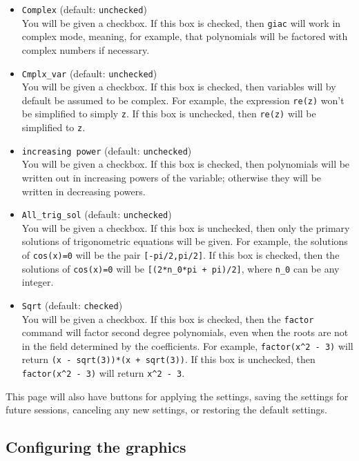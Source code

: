\documentclass[a4paper,11pt]{book}
\begin{document}
\begin{itemize}
  \item \texttt{Complex}  (default: \texttt{unchecked})\\
  You will be given a checkbox.  If this box is checked, then
  \texttt{giac} will work in complex mode, meaning, for example, that
  polynomials will be factored with complex numbers if necessary.
  
  \item \texttt{Cmplx\_var}  (default: \texttt{unchecked})\\
  You will be given a checkbox.  If this box is checked, then
  variables will by default be assumed to be complex.  For example,
  the expression \texttt{re(z)} won't be simplified to simply
  \texttt{z}.  If this box is unchecked, then \texttt{re(z)} will be
  simplified to \texttt{z}.
  
  \item \texttt{increasing power}  (default: \texttt{unchecked})\\
  You will be given a checkbox.  If this box is checked, then
  polynomials will be written out in increasing powers of the
  variable; otherwise they will be written in decreasing powers.
  
  \item \texttt{All\_trig\_sol}  (default: \texttt{unchecked})\\
  You will be given a checkbox.  If this box is unchecked, then only
  the primary solutions of trigonometric equations will be given.  For
  example, the solutions of \texttt{cos(x)=0} will be the pair
  \texttt{[-pi/2,pi/2]}.  If this box is checked, then the solutions of 
  \texttt{cos(x)=0} will be \texttt{[(2*n\_0*pi + pi)/2]}, where
  \texttt{n\_0} can be any integer.
  
  \item \texttt{Sqrt}  (default: \texttt{checked})\\
  You will be given a checkbox.  If this box is checked, then the
  \texttt{factor} command will factor second degree polynomials, even
  when the roots are not in the field determined by the coefficients.
  For example, \texttt{factor(x\^{}2 - 3)} will return 
  \texttt{(x - sqrt(3))*(x + sqrt(3))}.  If this box is unchecked, then 
  \texttt{factor(x\^{}2 - 3)} will return \texttt{x\^{}2 - 3}.
\end{itemize}
This page will also have buttons for applying the settings, saving the
settings for future sessions, canceling any new settings, or restoring
the default settings.


\subsection{Configuring the graphics}
\label{ssec:confgraph}
\end{document}
